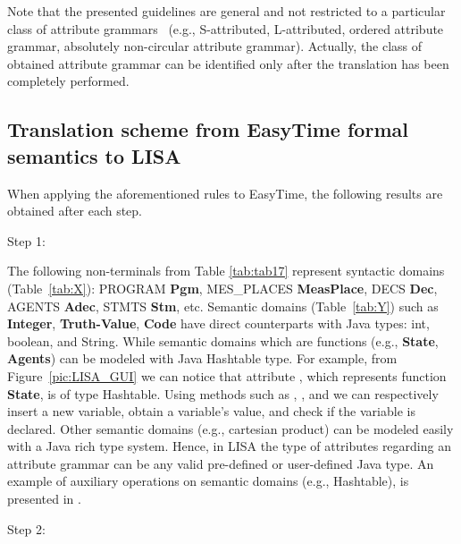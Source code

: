 \documentclass[preprint, prX]{revtex4}
\begin{document}
Note that the presented guidelines are general and not restricted to a particular class of attribute grammars~\cite{Knuth:1968,Paakki:1995} (e.g., S-attributed, L-attributed, ordered attribute grammar, absolutely non-circular attribute grammar). Actually, the class of obtained attribute grammar can be identified only after the translation has been completely performed.


\subsection{Translation scheme from EasyTime formal semantics to LISA}
When applying the aforementioned rules to EasyTime, the following results are obtained after each step.

Step 1:

The following non-terminals from Table \ref{tab:tab17} represent syntactic domains (Table~\ref{tab:X}):
PROGRAM  \textbf{Pgm}, MES\_PLACES  \textbf{MeasPlace}, DECS  \textbf{Dec}, AGENTS  \textbf{Adec},
STMTS  \textbf{Stm}, etc. Semantic domains (Table~\ref{tab:Y}) such as \textbf{Integer}, \textbf{Truth-Value}, \textbf{Code} have direct counterparts with Java types: int, boolean, and String. While semantic domains which are functions (e.g., \textbf{State}, \textbf{Agents}) can be modeled with Java  Hashtable type.
For example, from Figure~\ref{pic:LISA_GUI} we can notice that attribute , which represents function \textbf{State}, is of type Hashtable. Using methods such as
, , and  we can respectively insert a new variable, obtain a variable's value, and check if the variable is declared.
Other semantic domains (e.g., cartesian product) can be modeled easily with a Java rich type system. Hence, in LISA the type of attributes regarding an attribute grammar can be any valid pre-defined or user-defined Java type. An example of auxiliary operations on semantic domains (e.g., Hashtable), is presented in \cite{Fister:2011a}.


\newpage
Step 2:
\end{document}
